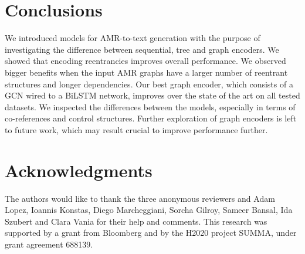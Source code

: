 \documentclass[11pt,a4paper]{article}
\begin{document}
\section{Conclusions}
We introduced models for AMR-to-text generation with the purpose of investigating the difference between sequential, tree and graph encoders. We showed that encoding reentrancies improves overall performance. We observed bigger benefits when the input AMR graphs have a larger number of reentrant structures and longer dependencies. Our best graph encoder, which consists of a GCN wired to a BiLSTM network, improves over the state of the art on all tested datasets. 
We inspected the differences between the models, especially in terms of co-references and control structures. 
Further exploration of graph encoders is left to future work, which may result crucial to improve performance further.

\section*{Acknowledgments}

The authors would like to thank the three anonymous reviewers and Adam Lopez, Ioannis Konstas, Diego Marcheggiani, Sorcha Gilroy, Sameer Bansal, Ida Szubert and Clara Vania for their help and comments. This research was supported by a grant from Bloomberg and by the H2020 project SUMMA, under grant agreement 688139.



\end{document}

